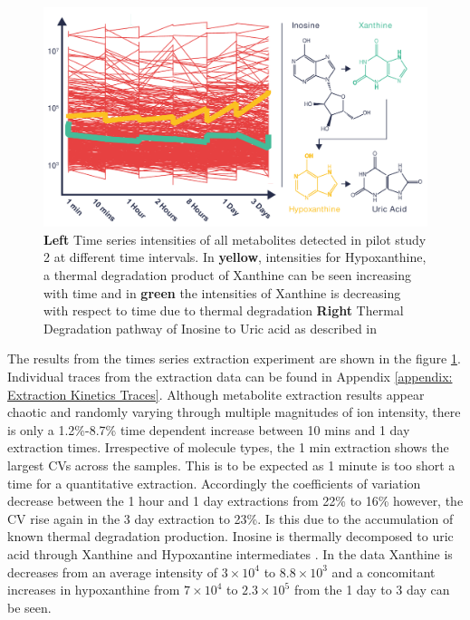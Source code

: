 \documentclass[a4paper,11pt,twoside]{book}
\begin{document}
	\begin{figure}[ht]
		\includegraphics[width=1.2\linewidth]{2.Optimizaiton_Figures/Extraction_Details.pdf}
		\caption{\textbf{Left} Time series intensities of all metabolites detected in pilot study 2 at different time intervals. In \textbf{yellow}, intensities for Hypoxanthine, a thermal degradation product of Xanthine can be seen increasing with time and in \textbf{green} the intensities of Xanthine is decreasing with respect to time due to thermal degradation  \textbf{Right} Thermal Degradation pathway of Inosine to Uric acid as described in \citep{FangThermalInvestigation}  }
		\label{fig:Pilot Study 2 - Extraction Time Series}
	\end{figure}
	
	The results from the times series extraction experiment are shown in the figure \ref{fig:Pilot Study 2 - Extraction Time Series}. Individual traces from the extraction data can be found in Appendix \ref{appendix: Extraction Kinetics Traces}. Although metabolite extraction results appear chaotic and randomly varying through multiple magnitudes of ion intensity, there is only a 1.2\%-8.7\% time dependent increase between 10 mins and 1 day extraction times. Irrespective of molecule types, the 1 min extraction shows the largest CVs across the samples. This is to be expected as 1 minute is too short a time for a quantitative extraction. Accordingly the coefficients of variation decrease between the 1 hour and 1 day extractions from 22\% to 16\% however, the CV rise again in the 3 day extraction to 23\%. Is this due to the accumulation of known thermal degradation production. Inosine is thermally decomposed to uric acid through Xanthine and Hypoxantine intermediates \citep{FangThermalInvestigation}. In the data Xanthine is decreases from an average intensity of $3\times10^4$ to $8.8\times10^3$ and a concomitant increases in hypoxanthine from $7\times10^4$ to $2.3\times10^5$ from the 1 day to 3 day can be seen.
	
\end{document}
